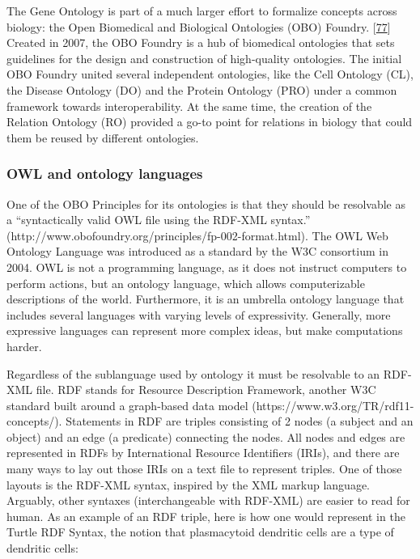 The Gene Ontology is part of a much larger effort to formalize concepts across biology: the Open Biomedical and Biological Ontologies (OBO) Foundry. {[}\protect\hyperlink{ref-j3tJyG7J}{77}{]}
Created in 2007, the OBO Foundry is a hub of biomedical ontologies that sets guidelines for the design and construction of high-quality ontologies.
The initial OBO Foundry united several independent ontologies, like the Cell Ontology (CL), the Disease Ontology (DO) and the Protein Ontology (PRO) under a common framework towards interoperability.
At the same time, the creation of the Relation Ontology (RO) provided a go-to point for relations in biology that could them be reused by different ontologies.

\hypertarget{owl-and-ontology-languages}{%
\subsubsection{OWL and ontology languages}\label{owl-and-ontology-languages}}

One of the OBO Principles for its ontologies is that they should be resolvable as a ``syntactically valid OWL file using the RDF-XML syntax.'' (http://www.obofoundry.org/principles/fp-002-format.html).
The OWL Web Ontology Language was introduced as a standard by the W3C consortium in 2004.
OWL is not a programming language, as it does not instruct computers to perform actions, but an ontology language, which allows computerizable descriptions of the world.
Furthermore, it is an umbrella ontology language that includes several languages with varying levels of expressivity.
Generally, more expressive languages can represent more complex ideas, but make computations harder.

Regardless of the sublanguage used by ontology it must be resolvable to an RDF-XML file. RDF stands for Resource Description Framework, another W3C standard built around a graph-based data model (https://www.w3.org/TR/rdf11-concepts/).
Statements in RDF are triples consisting of 2 nodes (a subject and an object) and an edge (a predicate) connecting the nodes.
All nodes and edges are represented in RDFs by International Resource Identifiers (IRIs), and there are many ways to lay out those IRIs on a text file to represent triples.
One of those layouts is the RDF-XML syntax, inspired by the XML markup language.
Arguably, other syntaxes (interchangeable with RDF-XML) are easier to read for human.
As an example of an RDF triple, here is how one would represent in the Turtle RDF Syntax, the notion that plasmacytoid dendritic cells are a type of dendritic cells:

